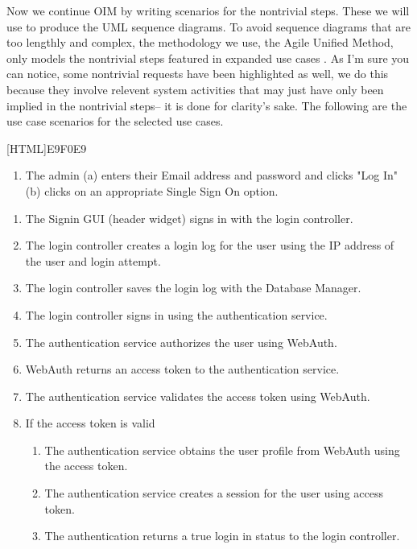 \documentclass[11pt]{article}
\begin{document}
Now we continue OIM by writing scenarios for the nontrivial steps. These we will use to produce the UML sequence diagrams. To avoid sequence diagrams that are too lengthly and complex, the methodology we use, the Agile Unified Method, only models the nontrivial steps featured in expanded use cases \cite{Book:1}. As I'm sure you can notice, some nontrivial requests have been highlighted as well, we do this because they involve relevent system activities that may just have only been implied in the nontrivial steps-- it is done for clarity's sake. The following are the use case scenarios for the selected use cases.

\begin{table}[H]
	\centering
	[HTML]{E9F0E9}{\parbox{\textwidth}{
		\begin{enumerate}[label=3.]
			\item The admin (a) enters their Email address and password and clicks "Log In" (b) clicks on an appropriate Single Sign On option.
		\end{enumerate}
		\begin{enumerate}[label=4.\arabic*.]
			\item The Signin GUI (header widget) signs in with the login controller.
			\item The login controller creates a login log for the user using the IP address of the user and login attempt.
			\item The login controller saves the login log with the Database Manager.
			\item The login controller signs in using the authentication service.
			\item The authentication service authorizes the user using WebAuth.
			\item WebAuth returns an access token to the authentication service.
			\item The authentication service validates the access token using WebAuth.
			\item If the access token is valid
			\begin{enumerate}[label*=\arabic*.]
				\item The authentication service obtains the user profile from WebAuth using the access token.
				\item The authentication service creates a session for the user using access token.
				\item The authentication returns a true login in status to the login controller.
			\end{enumerate}

\end{enumerate}}}
\end{table}
\end{document}
